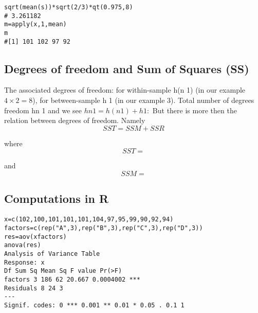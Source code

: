 \begin{verbatim}
sqrt(mean(s))*sqrt(2/3)*qt(0.975,8)
# 3.261182
m=apply(x,1,mean)
m
#[1] 101 102 97 92
\end{verbatim}

\subsection{Degrees of freedom and Sum of Squares (SS)}
The associated degrees of freedom: for within-sample h(n  1) (in our example $4 \times 2 = 8$), for between-sample
h  1 (in our example 3).
Total number of degrees freedom hn  1 and we see
$hn  1 = h(n  1) + h  1:$
But there is more then the relation between degrees of freedom. Namely
\[ SST = SSM + SSR \]

where
\[ SST = \]

and
\[ SSM = \]

\subsection{Computations in R}
\begin{verbatim}
x=c(102,100,101,101,101,104,97,95,99,90,92,94)
factors=c(rep("A",3),rep("B",3),rep("C",3),rep("D",3))
res=aov(xfactors)
anova(res)
Analysis of Variance Table
Response: x
Df Sum Sq Mean Sq F value Pr(>F)
factors 3 186 62 20.667 0.0004002 ***
Residuals 8 24 3
---
Signif. codes: 0 *** 0.001 ** 0.01 * 0.05 . 0.1 1

\end{verbatim}

